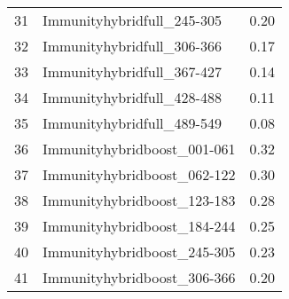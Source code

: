 \begin{table}[ht]
\begin{tabular}{rlr}
  31 & Immunityhybridfull\_245-305 & 0.20 \\ 
  32 & Immunityhybridfull\_306-366 & 0.17 \\ 
  33 & Immunityhybridfull\_367-427 & 0.14 \\ 
  34 & Immunityhybridfull\_428-488 & 0.11 \\ 
  35 & Immunityhybridfull\_489-549 & 0.08 \\ 
  36 & Immunityhybridboost\_001-061 & 0.32 \\ 
  37 & Immunityhybridboost\_062-122 & 0.30 \\ 
  38 & Immunityhybridboost\_123-183 & 0.28 \\ 
  39 & Immunityhybridboost\_184-244 & 0.25 \\ 
  40 & Immunityhybridboost\_245-305 & 0.23 \\ 
  41 & Immunityhybridboost\_306-366 & 0.20 \\ 
   \hline
\end{tabular}
\end{table}
